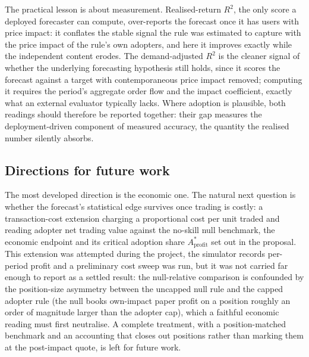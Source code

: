 \documentclass[12pt]{article}
\begin{document}
The practical lesson is about measurement. Realised-return $R^{2}$, the only score a deployed forecaster can compute, over-reports the forecast once it has users with price impact: it conflates the stable signal the rule was estimated to capture with the price impact of the rule's own adopters, and here it improves exactly while the independent content erodes. %
The demand-adjusted $R^{2}$ is the cleaner signal of whether the underlying forecasting hypothesis still holds, since it scores the forecast against a target with contemporaneous price impact removed; computing it requires the period's aggregate order flow and the impact coefficient, exactly what an external evaluator typically lacks. %
Where adoption is plausible, both readings should therefore be reported together: their gap measures the deployment-driven component of measured accuracy, the quantity the realised number silently absorbs. %

\subsection{Directions for future work}\label{sec:future-work}

The most developed direction is the economic one. The natural next question is whether the forecast's statistical edge survives once trading is costly: a transaction-cost extension charging a proportional cost per unit traded and reading adopter net trading value against the no-skill null benchmark, the economic endpoint and its critical adoption share $A^{*}_{\mathrm{profit}}$ set out in the proposal. This extension was attempted during the project, the simulator records per-period profit and a preliminary cost sweep was run, but it was not carried far enough to report as a settled result: the null-relative comparison is confounded by the position-size asymmetry between the uncapped null rule and the capped adopter rule (the null books own-impact paper profit on a position roughly an order of magnitude larger than the adopter cap), which a faithful economic reading must first neutralise. A complete treatment, with a position-matched benchmark and an accounting that closes out positions rather than marking them at the post-impact quote, is left for future work.
\end{document}
